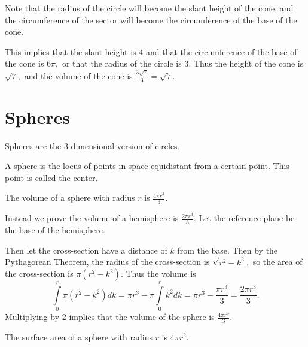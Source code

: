 \begin{sol}
Note that the radius of the circle will become the slant height of the cone, and the circumference of the sector will become the circumference of the base of the cone.

This implies that the slant height is $4$ and that the circumference of the base of the cone is $6\pi,$ or that the radius of the circle is $3.$ Thus the height of the cone is $\sqrt{7},$ and the volume of the cone is $\frac{3\sqrt{7}}{3}=\sqrt{7}.$
\end{sol}

\section{Spheres}

Spheres are the $3$ dimensional version of circles.
\begin{defi}[Sphere]
A sphere is the locus of points in space equidistant from a certain point. This point is called the center.
\begin{center}
\end{center}
\end{defi}

\begin{theo}
The volume of a sphere with radius $r$ is $\frac{4\pi r^3}{3}.$
\end{theo}

\begin{pro}
Instead we prove the volume of a hemisphere is $\frac{2\pi r^3}{3}.$ Let the reference plane be the base of the hemisphere.

Then let the cross-section have a distance of $k$ from the base. Then by the Pythagorean Theorem, the radius of the cross-section is $\sqrt{r^2-k^2},$ so the area of the cross-section is $\pi(r^2-k^2).$ Thus the volume is \[\int\limits_{0}^{r}\pi(r^2-k^2)dk=\pi r^3-\pi \int\limits_{0}^{r}k^2dk=\pi r^3-\frac{\pi r^3}{3}=\frac{2\pi r^3}{3}.\]
Multiplying by $2$ implies that the volume of the sphere is $\frac{4\pi r^3}{3}.$
\end{pro}

\begin{theo}
The surface area of a sphere with radius $r$ is $4\pi r^2.$
\end{theo}

